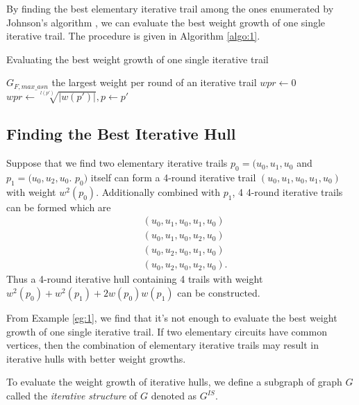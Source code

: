 By finding the best elementary iterative trail among the ones enumerated by Johnson's algorithm \cite{J75}, we can evaluate the best weight growth of one single iterative trail. The procedure is given in Algorithm \ref{algo:1}. %

\begin{algorithm}
	\caption{Evaluating the best weight growth of one single iterative trail}
	\label{algo:1}
	\begin{algorithmic}[1]
		\Require $G_{F,max\_asn}$
		\Ensure the largest weight per round of an iterative trail
		\Procedure {}{}
		\State $wpr\leftarrow 0$
		\State $wpr\leftarrow \sqrt[l(p')]{|w(p')|},p\leftarrow p'$
		\EndIf
		\EndFor
		\State {}
		\EndProcedure
	\end{algorithmic}
\end{algorithm}

\subsection{Finding the Best Iterative Hull}\label{sec:fbih}

\begin{example}\label{eg:1}
	Suppose that we find two elementary iterative trails $p_0=(u_0,u_1,u_0$ and $p_1=(u_0,u_2 ,u_0$. $p_0)$ itself can form a 4-round iterative trail $(u_0,u_1,u_0,u_1,u_0)$ with weight $w^2(p_0)$. Additionally combined with $p_1$, 4 4-round iterative trails can be formed which are
	\begin{align*}
		&(u_0,u_1,u_0,u_1,u_0)\\
		&(u_0,u_1,u_0,u_2,u_0)\\
		&(u_0,u_2,u_0,u_1,u_0)\\
		&(u_0,u_2,u_0,u_2,u_0).
	\end{align*}
	Thus a 4-round iterative hull containing 4 trails with weight $w^2(p_0)+w^2(p_1)+2w(p_0)w(p_1)$ can be constructed.
\end{example}

From Example \ref{eg:1}, we find that it's not enough to evaluate the best weight growth of one single iterative trail. If two elementary circuits have common vertices, then the combination of elementary iterative trails may result in iterative hulls with better weight growths.  

To evaluate the weight growth of iterative hulls, we define a subgraph of graph $G$ called the \textit{iterative structure} of $G$ denoted as $G^{IS}$. 

